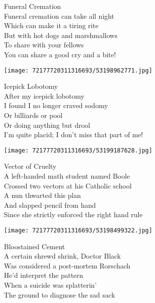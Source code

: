 \documentclass[10pt,letterpaper]{article}
\begin{document}
\begin{center}
Funeral Cremation\\
\vskip 0.2in
Funeral cremation can take all night\\
Which can make it a tiring rite\\
But with hot dogs and marshmallows\\
To share with your fellows\\
You can share a good cry and a bite!\\
\end{center}
\pagebreak

\begin{center}\texttt{[image: 72177720311316693/53198962771.jpg]}
\end{center}
\begin{center}
Icepick Lobotomy\\
\vskip 0.2in
After my icepick lobotomy\\
I found I no longer craved sodomy\\
Or billiards or pool\\
Or doing anything but drool\\
I'm quite placid; I don't miss that part of me!\\
\end{center}
\pagebreak

\begin{center}\texttt{[image: 72177720311316693/53199187628.jpg]}
\end{center}
\begin{center}
Vector of Cruelty\\
\vskip 0.2in
A left-handed math student named Boole\\
Crossed two vectors at his Catholic school\\
A nun thwarted this plan\\
And slapped pencil from hand\\
Since she strictly enforced the right hand rule\\
\end{center}
\pagebreak

\begin{center}
\texttt{[image: 72177720311316693/53198499322.jpg]}
\end{center}

\begin{center}
Bloostained Cement\\
\vskip 0.2in
A certain shrewd shrink, Doctor Black\\
Was considered a post-mortem Rorschach\\
He'd interpret the pattern\\
When a suicide was splatterin'\\
The ground to diagnose the sad sack\\
\end{center}
\pagebreak
\end{document}
